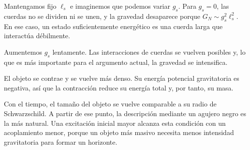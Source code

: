 Mantengamos fijo \(\ell_s\) e imaginemos que podemos variar \(g_s\). Para \(g_s=0\), las cuerdas no se dividen ni se unen, y la gravedad desaparece porque \(G_N\sim g_s^2\ell_s^2\). En ese caso, un estado suficientemente energético es una cuerda larga que interactúa débilmente.

Aumentemos \(g_s\) lentamente. Las interacciones de cuerdas se vuelven posibles y, lo que es más importante para el argumento actual, la gravedad se intensifica.

\begin{classroomqa}\end{classroomqa}

El objeto se contrae y se vuelve más denso. Su energía potencial gravitatoria es negativa, así que la contracción reduce su energía total y, por tanto, su masa.

\begin{classroomqa}\end{classroomqa}

Con el tiempo, el tamaño del objeto se vuelve comparable a su radio de Schwarzschild. A partir de ese punto, la descripción mediante un agujero negro es la más natural. Una excitación inicial mayor alcanza esta condición con un acoplamiento menor, porque un objeto más masivo necesita menos intensidad gravitatoria para formar un horizonte.

